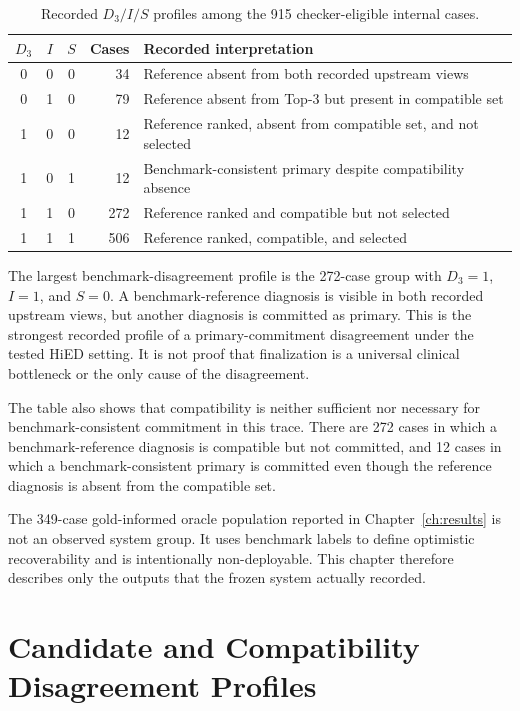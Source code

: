 \begin{table}[htbp]
\centering
\caption{Recorded $D_3/I/S$ profiles among the 915 checker-eligible internal cases.}
\label{tab:ch8-joint-profiles}
\small
\begin{tabularx}{\textwidth}{|c|c|c|r|X|}
\hline
$D_3$ & $I$ & $S$ & Cases & Recorded interpretation\\
\hline
0 & 0 & 0 & 34 & Reference absent from both recorded upstream views\\
\hline
0 & 1 & 0 & 79 & Reference absent from Top-3 but present in compatible set\\
\hline
1 & 0 & 0 & 12 & Reference ranked, absent from compatible set, and not selected\\
\hline
1 & 0 & 1 & 12 & Benchmark-consistent primary despite compatibility absence\\
\hline
1 & 1 & 0 & 272 & Reference ranked and compatible but not selected\\
\hline
1 & 1 & 1 & 506 & Reference ranked, compatible, and selected\\
\hline
\end{tabularx}
\end{table}

The largest benchmark-disagreement profile is the 272-case group with $D_3=1$, $I=1$, and $S=0$. A benchmark-reference diagnosis is visible in both recorded upstream views, but another diagnosis is committed as primary. This is the strongest recorded profile of a primary-commitment disagreement under the tested HiED setting. It is not proof that finalization is a universal clinical bottleneck or the only cause of the disagreement.

The table also shows that compatibility is neither sufficient nor necessary for benchmark-consistent commitment in this trace. There are 272 cases in which a benchmark-reference diagnosis is compatible but not committed, and 12 cases in which a benchmark-consistent primary is committed even though the reference diagnosis is absent from the compatible set.

The 349-case gold-informed oracle population reported in Chapter~\ref{ch:results} is not an observed system group. It uses benchmark labels to define optimistic recoverability and is intentionally non-deployable. This chapter therefore describes only the outputs that the frozen system actually recorded.

\section{Candidate and Compatibility Disagreement Profiles}

